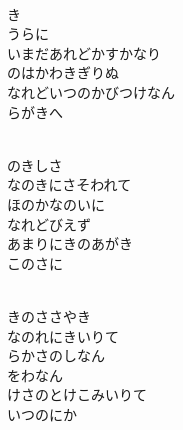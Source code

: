 \documentclass[10pt,b5j]{tarticle} %
\begin{document}
\begin{enumerate}
\begin{minipage}[c]{\blocksize}
        \vspace{\linespace}
        \item~\\
        き\\
        うらに\\
        いまだあれどかすかなり\\
        のはかわきぎりぬ\\
        なれどいつのかびつけなん\\
        らがきへ
        
    \end{minipage}
    \begin{minipage}[c]{\blocksize}
        
        \vspace{\linespace}
        \item~\\
        のきしさ\\
        なのきにさそわれて\\
        ほのかなのいに\\
        なれどびえず\\
        あまりにきのあがき\\
        このさに
        
    \end{minipage}
    \begin{minipage}[c]{\blocksize}
        
        \vspace{\linespace}
        \item~\\
        きのささやき\\
        なのれにきいりて\\
        らかさのしなん\\
        をわなん\\
        けさのとけこみいりて\\
        いつのにか
    
    \end{minipage}
\end{enumerate} %
\end{document}
